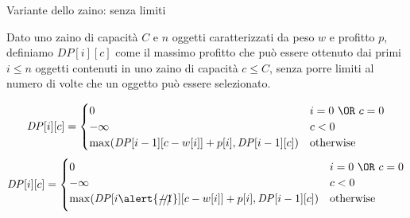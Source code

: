 \begin{frame}{Variante dello zaino: senza limiti}

\vspace{-9pt}
\begin{myboxtitle}
Dato uno zaino di capacità $C$ e $n$ oggetti caratterizzati
da peso $w$ e profitto $p$, definiamo $\mathit{DP}[i][c]$ come il
massimo profitto che può essere ottenuto dai primi $i \leq n$
oggetti contenuti in uno zaino di capacità $c \leq C$, \alert{senza porre
limiti al numero di volte che un oggetto può essere selezionato}.
\end{myboxtitle}


\small
\begin{overprint}
\[
\mathit{DP}[i][c] = \begin{cases}
  0 & i=0\ \OR\ c=0 \\
  -\infty & c < 0 \\
  \max( \mathit{DP}[i-1][c-w[i]] + p[i], \mathit{DP}[i-1][c] ) & \textrm{otherwise}
\end{cases}
\]
\[
\mathit{DP}[i][c] = \begin{cases}
  0 & i=0\ \OR\ c=0 \\
  -\infty & c < 0 \\
  \max( \mathit{DP}[i\alert{\xout{-1}}][c-w[i]] + p[i], \mathit{DP}[i-1][c] ) & \textrm{otherwise}
\end{cases}
\]
\end{overprint}

\end{frame}

